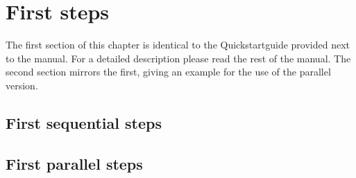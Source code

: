 \chapter{First steps}

{\small The first section of this chapter is identical to the Quickstartguide provided next to the manual. For a detailed description please read the rest of the manual. 
The second section mirrors the first, giving an example for the use of the parallel version.}
\bigbreak

\section{First sequential steps}
\label{Quickstart}


\section{First parallel steps}
\label{FirstParallelSteps}
